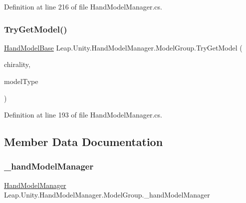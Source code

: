 Definition at line 216 of file Hand\+Model\+Manager.\+cs.

\mbox{\label{class_leap_1_1_unity_1_1_hand_model_manager_1_1_model_group_a7860e9dfad7b9f97443e52f499cb59b5}} 
\subsubsection{\texorpdfstring{TryGetModel()}{TryGetModel()}}
{\footnotesize\ttfamily \mbox{\hyperlink{class_leap_1_1_unity_1_1_hand_model_base}{Hand\+Model\+Base}} Leap.\+Unity.\+Hand\+Model\+Manager.\+Model\+Group.\+Try\+Get\+Model (\begin{DoxyParamCaption}\item[{\mbox{\hyperlink{namespace_leap_1_1_unity_a4d15adcf20ba121b2cd9c07f503b606f}{Chirality}}}]{chirality,  }\item[{\mbox{\hyperlink{namespace_leap_1_1_unity_a186e5eb0a2b743f1f6b79346f0ab8ad0}{Model\+Type}}}]{model\+Type }\end{DoxyParamCaption})}



Definition at line 193 of file Hand\+Model\+Manager.\+cs.



\subsection{Member Data Documentation}
\mbox{\label{class_leap_1_1_unity_1_1_hand_model_manager_1_1_model_group_a9d5316e304d9d93a94d3e2702530191f}} 
\subsubsection{\texorpdfstring{\_handModelManager}{\_handModelManager}}
{\footnotesize\ttfamily \mbox{\hyperlink{class_leap_1_1_unity_1_1_hand_model_manager}{Hand\+Model\+Manager}} Leap.\+Unity.\+Hand\+Model\+Manager.\+Model\+Group.\+\_\+hand\+Model\+Manager}



